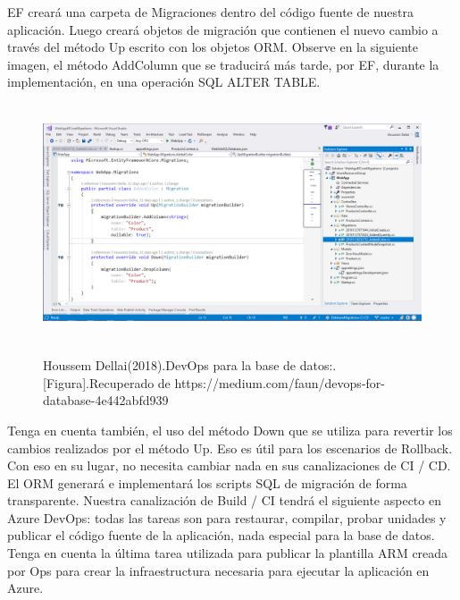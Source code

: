 \documentclass[preprint,12pt]{elsarticle}
\begin{document}
EF creará una carpeta de Migraciones dentro del código fuente de nuestra aplicación. Luego creará objetos de migración que contienen el nuevo cambio a través del método Up escrito con los objetos ORM. Observe en la siguiente imagen, el método AddColumn que se traducirá más tarde, por EF, durante la implementación, en una operación SQL ALTER TABLE.

	\begin{figure}[H]
			\begin{center}
					\includegraphics[width=12cm,height=7cm]{./IMAGENES/analisis1}
			\end{center}
			Houssem Dellai(2018).DevOps para la base de datos:.[Figura].Recuperado de 
https://medium.com/faun/devops-for-database-4e442abfd939
		\end{figure}

Tenga en cuenta también, el uso del método Down que se utiliza para revertir los cambios realizados por el método Up. Eso es útil para los escenarios de Rollback.
Con eso en su lugar, no necesita cambiar nada en sus canalizaciones de CI / CD. El ORM generará e implementará los scripts SQL de migración de forma transparente. Nuestra canalización de Build / CI tendrá el siguiente aspecto en Azure DevOps: todas las tareas son para restaurar, compilar, probar unidades y publicar el código fuente de la aplicación, nada especial para la base de datos. Tenga en cuenta la última tarea utilizada para publicar la plantilla ARM creada por Ops para crear la infraestructura necesaria para ejecutar la aplicación en Azure.
\end{document}
